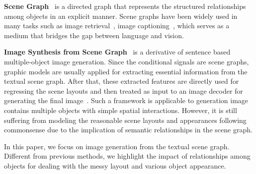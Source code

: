 \textbf{Scene Graph}~\cite{xu2017scene} is a directed graph that represents the structured relationships among objects in an explicit manner. Scene graphs have been widely used in many tasks such as image retrieval~\cite{johnson2015image}, image captioning~\cite{anderson2016spice}, which serves as a medium that bridges the gap between language and vision. %


\textbf{Image Synthesis from Scene Graph}~\cite{johnson2018image} is a derivative of sentence based multiple-object image generation. Since the conditional signals are scene graphs, graphic models are usually applied for extracting essential information from the textual scene graph. After that, these extracted features are directly used for regressing the scene layouts and then treated as input to an image decoder for generating the final image~\cite{ashual2019specifying}. Such a framework is applicable to generation image contains multiple objects with simple spatial interactions. However, it is still suffering from modeling the reasonable scene layouts and appearances following commonsense due to the implication of semantic relationships in the scene graph.


In this paper, we focus on image generation from the textual scene graph. Different from previous methods, we highlight the impact of relationships among objects for dealing with the messy layout and various object appearance.%


